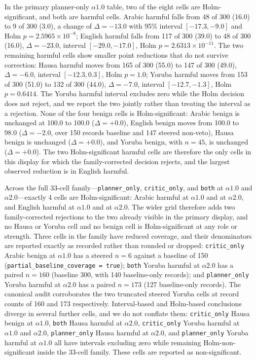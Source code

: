 In the primary planner-only $\alpha1.0$ table, two of the eight cells are
Holm-significant, and both are harmful cells. Arabic harmful falls from 48 of
300 (16.0) to 9 of 300 (3.0), a change of $\Delta = -13.0$ with 95\% interval
$[-17.3, -9.0]$ and Holm $p = 2.5965\times10^{-8}$; English harmful falls from
117 of 300 (39.0) to 48 of 300 (16.0), $\Delta = -23.0$, interval
$[-29.0, -17.0]$, Holm $p = 2.6313\times10^{-11}$. The two remaining harmful
cells show smaller point reductions that do not survive correction: Hausa
harmful moves from 165 of 300 (55.0) to 147 of 300 (49.0), $\Delta = -6.0$,
interval $[-12.3, 0.3]$, Holm $p = 1.0$; Yoruba harmful moves from 153 of 300
(51.0) to 132 of 300 (44.0), $\Delta = -7.0$, interval $[-12.7, -1.3]$, Holm
$p = 0.6414$. The Yoruba harmful interval excludes zero while the Holm decision
does not reject, and we report the two jointly rather than treating the interval
as a rejection. None of the four benign cells is Holm-significant: Arabic benign
is unchanged at 100.0 to 100.0 ($\Delta = +0.0$), English benign moves from
100.0 to 98.0 ($\Delta = -2.0$, over 150 records baseline and 147 steered
non-veto), Hausa benign is unchanged ($\Delta = +0.0$), and Yoruba benign, with
$n = 45$, is unchanged ($\Delta = +0.0$). The two Holm-significant harmful cells
are therefore the only cells in this display for which the family-corrected
decision rejects, and the largest observed reduction is in English harmful.

Across the full 33-cell family---\texttt{planner\_only}, \texttt{critic\_only},
and \texttt{both} at $\alpha1.0$ and $\alpha2.0$---exactly 4 cells are
Holm-significant: Arabic harmful at $\alpha1.0$ and at $\alpha2.0$, and English
harmful at $\alpha1.0$ and at $\alpha2.0$. The wider grid therefore adds two
family-corrected rejections to the two already visible in the primary display,
and no Hausa or Yoruba cell and no benign cell is Holm-significant at any role
or strength. Three cells in the family have reduced coverage, and their
denominators are reported exactly as recorded rather than rounded or dropped:
\texttt{critic\_only} Arabic benign at $\alpha1.0$ has a steered $n = 6$ against
a baseline of 150 (\texttt{partial\_baseline\_coverage = true});
\texttt{both} Yoruba harmful at $\alpha2.0$ has a paired $n = 160$ (baseline
300, with 140 baseline-only records); and \texttt{planner\_only} Yoruba harmful
at $\alpha2.0$ has a paired $n = 173$ (127 baseline-only records). The canonical
audit corroborates the two truncated steered Yoruba cells at record counts of
160 and 173 respectively. Interval-based and Holm-based conclusions diverge in
several further cells, and we do not conflate them: \texttt{critic\_only} Hausa
benign at $\alpha1.0$, \texttt{both} Hausa harmful at $\alpha2.0$,
\texttt{critic\_only} Yoruba harmful at $\alpha1.0$ and $\alpha2.0$,
\texttt{planner\_only} Hausa harmful at $\alpha2.0$, and \texttt{planner\_only}
Yoruba harmful at $\alpha1.0$ all have intervals excluding zero while remaining
Holm-non-significant inside the 33-cell family. These cells are reported as
non-significant.

